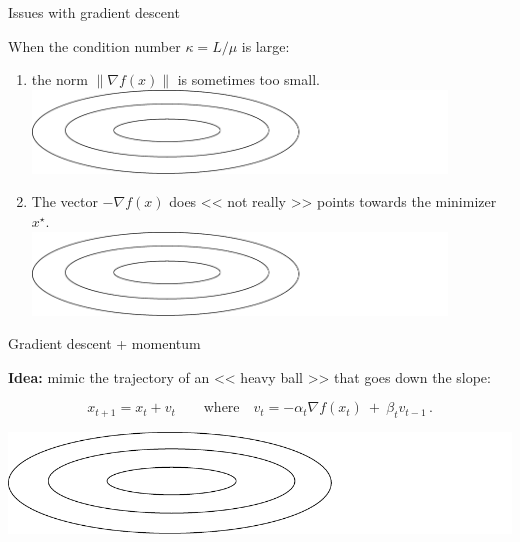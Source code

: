\documentclass{beamer}
\begin{document}
\begin{frame}[t]{Issues with gradient descent}
	\grid

	\vspace{-0.3cm}
	When the condition number $\kappa = L / \mu$ is large:
	\vspace{0.2cm}
	\begin{enumerate}
		\item the norm $ \|\nabla f(x) \|$ is sometimes too small.
			\vspace{-1.0cm}$$
			$$
			\hspace*{1cm}
			\includegraphics[width=11cm]{../figures/contour.pdf}
		\item The vector $- \nabla f(x)$ does << not really >> points towards the minimizer $x^{\star}$.
			\vspace{-1.0cm}$$
			$$
			\hspace*{1cm}
			\includegraphics[width=11cm]{../figures/contour.pdf}
	\end{enumerate}

\end{frame}

\begin{frame}[t]{Gradient descent + momentum}
	\grid

	\textbf{Idea:} mimic the trajectory of an << heavy ball >> that goes down the slope:
	\vspace{-0.3cm}
	\begin{exampleblock}{}
		\vspace{-0.3cm}
		$$
		x_{t+1} = x_t + v_t \qquad \text{where} \quad v_t = - \alpha_t \nabla f(x_t)  \ + \ \beta_t v_{t-1} \,.
		$$
	\end{exampleblock}

	\vspace{0.7cm}
	\hspace*{0.7cm}\includegraphics[width=15cm]{../figures/contour.pdf}
			

\end{frame}
\end{document}
